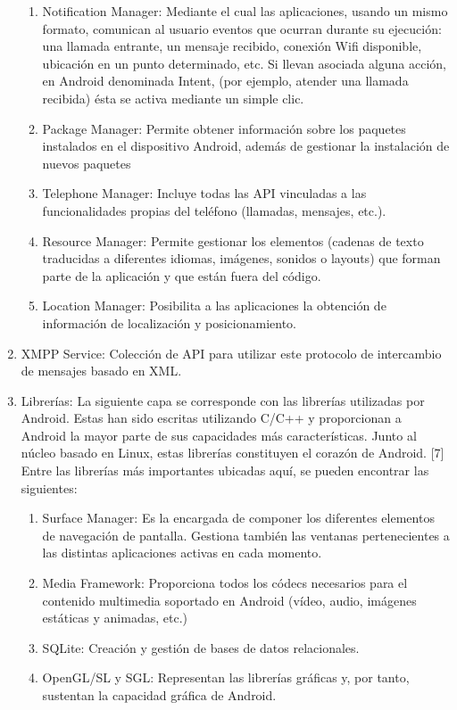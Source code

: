\begin{enumerate}
\begin{enumerate}
\item	Notification Manager: Mediante el cual las aplicaciones,
 usando un mismo formato, comunican al usuario eventos que
 ocurran durante su ejecución: una llamada entrante, un mensaje recibido,
 conexión Wifi disponible, ubicación en un punto determinado, etc. 
Si llevan asociada alguna acción, en Android denominada Intent,
(por ejemplo, atender una llamada recibida) ésta se activa mediante un simple clic.
\item	Package Manager: Permite obtener información sobre los
 paquetes instalados en el dispositivo Android, además de
 gestionar la instalación de nuevos paquetes 
\item	Telephone Manager: Incluye todas las API vinculadas
 a las funcionalidades propias del teléfono (llamadas, mensajes, etc.).
\item	Resource Manager: Permite gestionar los elementos
 (cadenas de texto traducidas a diferentes idiomas, imágenes, sonidos o layouts)
 que forman parte de la aplicación y que están fuera del código.
\item	Location Manager: Posibilita a las aplicaciones la obtención
 de información de localización y posicionamiento.
\end{enumerate}
\item XMPP Service: Colección de API para utilizar este protocolo
 de intercambio de mensajes basado en XML. 
\item	Librerías: La siguiente capa se corresponde con las librerías
 utilizadas por Android. Estas han sido escritas utilizando C/C++ y
 proporcionan a Android la mayor parte de sus capacidades 
más características. Junto al núcleo basado en Linux, estas librerías 
constituyen el corazón de Android. [7]
Entre las librerías más importantes ubicadas aquí, se pueden
 encontrar las siguientes:
\begin{enumerate}
\item	Surface Manager: Es la encargada de componer los 
diferentes elementos de navegación de pantalla. Gestiona
 también las ventanas pertenecientes a las distintas
 aplicaciones activas en cada momento.
\item	Media Framework: Proporciona todos los códecs necesarios 
para el contenido multimedia soportado en Android (vídeo, audio,
 imágenes estáticas y animadas, etc.)
\item	SQLite: Creación y gestión de bases de datos relacionales.
\item	OpenGL/SL y SGL: Representan las librerías gráficas y,
 por tanto, sustentan la capacidad gráfica de Android.

\end{enumerate}
\end{enumerate}
